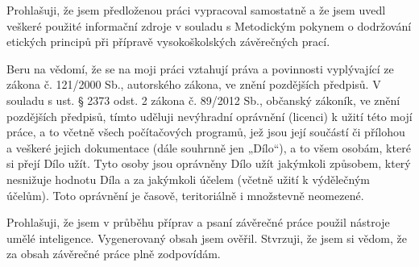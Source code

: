 \documentclass[czech,bachelor,oneside]{ctufit-thesis}
\begin{document}
\begin{declarationpage}
Prohlašuji, že jsem předloženou práci vypracoval samostatně a že jsem uvedl veškeré použité informační zdroje v souladu s Metodickým pokynem o dodržování etických principů při přípravě vysokoškolských závěrečných prací.

Beru na vědomí, že se na moji práci vztahují práva a povinnosti vyplývající ze zákona č. 121/2000 Sb., autorského zákona, ve znění pozdějších předpisů. V souladu s ust. § 2373 odst. 2 zákona č. 89/2012 Sb., občanský zákoník, ve znění pozdějších předpisů, tímto uděluji nevýhradní oprávnění (licenci) k užití této mojí práce, a to včetně všech počítačových programů, jež jsou její součástí či přílohou a veškeré jejich dokumentace (dále souhrnně jen „Dílo“), a to všem osobám, které si přejí Dílo užít. Tyto osoby jsou oprávněny Dílo užít jakýmkoli způsobem, který nesnižuje hodnotu Díla a za jakýmkoli účelem (včetně užití k výdělečným účelům). Toto oprávnění je časově, teritoriálně i množstevně neomezené.

Prohlašuji, že jsem v průběhu příprav a psaní závěrečné práce použil nástroje umělé
inteligence. Vygenerovaný obsah jsem ověřil. Stvrzuji, že jsem si vědom, že za obsah
závěrečné práce plně zodpovídám.
\end{declarationpage}

\printabstractpage %
\end{document}
